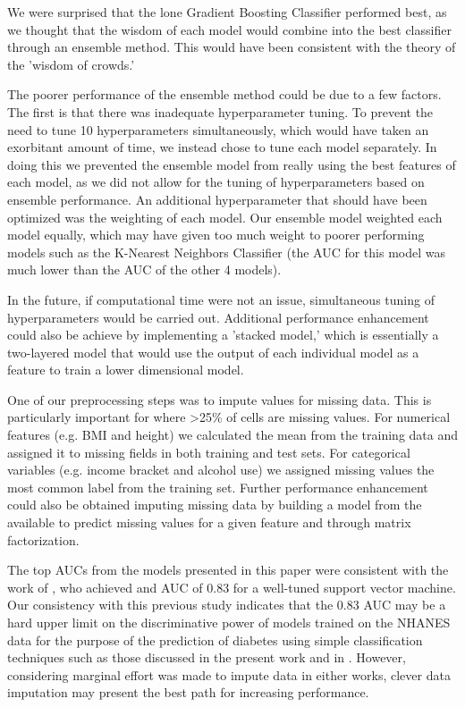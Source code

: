 \documentclass{article} %
\begin{document}
We were surprised that the lone Gradient Boosting Classifier performed best, as we thought that the wisdom of each model would combine into the best classifier through an ensemble method. This would have been consistent with the theory of the 'wisdom of crowds.'

The poorer performance of the ensemble method could be due to a few factors. The first is that there was inadequate hyperparameter tuning. To prevent the need to tune 10 hyperparameters simultaneously, which would have taken an exorbitant amount of time, we instead chose to tune each model separately. In doing this we prevented the ensemble model from really using the best features of each model, as we did not allow for the tuning of hyperparameters based on ensemble performance. 
An additional hyperparameter that should have been optimized was the weighting of each model. Our ensemble model weighted each model equally, which may have given too much weight to poorer performing models such as the K-Nearest Neighbors Classifier (the AUC for this model was much lower than the AUC of the other 4 models). 

In the future, if computational time were not an issue, simultaneous tuning of hyperparameters would be carried out. Additional performance enhancement could also be achieve by implementing a 'stacked model,' which is essentially a two-layered model that would use the output of each individual model as a feature to train a lower dimensional model. 

One of our preprocessing steps was to impute values for missing data. This is particularly important for where >25\% of cells are missing values. For numerical features (e.g. BMI and height) we calculated the mean from the training data and assigned it to missing fields in both training and test sets. For categorical variables (e.g. income bracket and alcohol use) we assigned missing values the most common label from the training set. Further performance enhancement could also be obtained imputing missing data by building a model from the available to predict missing values for a given feature and through matrix factorization. 

The top AUCs from the models presented in this paper were consistent with the work of \cite{yu_application_2010}, who achieved and AUC of 0.83 for a well-tuned support vector machine. Our consistency with this previous study indicates that the 0.83 AUC may be a hard upper limit on the discriminative power of models trained on the NHANES data for the purpose of the prediction of diabetes using simple classification techniques such as those discussed in the present work and in \cite{yu_application_2010}. However, considering marginal effort was made to impute data in either works, clever data imputation may present the best path for increasing performance.
\end{document}
